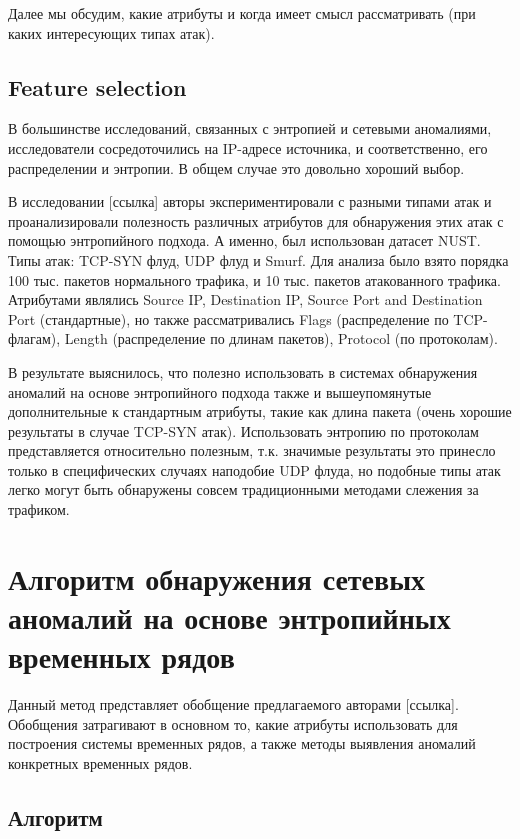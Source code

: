 \documentclass[]{interact}
\theoremstyle{plain}%
\theoremstyle{definition}
\theoremstyle{remark}
\begin{document}
 Далее мы обсудим, какие атрибуты и когда имеет смысл рассматривать (при каких интересующих типах атак).


\subsection{Feature selection}
В большинстве исследований, связанных с энтропией и сетевыми аномалиями, исследователи сосредоточились на IP-адресе источника, и соответственно, его распределении и энтропии. В общем случае это довольно хороший выбор.

В исследовании [ссылка] авторы экспериментировали с разными типами атак и проанализировали полезность различных атрибутов для обнаружения этих атак с помощью энтропийного подхода. А именно, был использован датасет NUST. Типы атак: TCP-SYN флуд, UDP флуд и Smurf. Для анализа было взято порядка 100 тыс. пакетов нормального трафика, и 10 тыс. пакетов атакованного трафика. Атрибутами являлись Source IP, Destination IP, Source Port and Destination Port (стандартные), но также рассматривались Flags (распределение по TCP-флагам), Length (распределение по длинам пакетов), Protocol (по протоколам).

В результате выяснилось, что полезно использовать в системах обнаружения аномалий на основе энтропийного подхода также и вышеупомянутые дополнительные к стандартным атрибуты, такие как длина пакета (очень хорошие результаты в случае TCP-SYN атак). Использовать энтропию по протоколам представляется относительно полезным, т.к. значимые результаты это принесло только в специфических случаях наподобие UDP флуда, но подобные типы атак легко могут быть обнаружены совсем традиционными методами слежения за трафиком.



\section{Алгоритм обнаружения сетевых аномалий на основе энтропийных временных рядов}

Данный метод представляет обобщение предлагаемого авторами [ссылка]. Обобщения затрагивают в основном то, какие атрибуты использовать для построения системы временных рядов, а также методы выявления аномалий конкретных временных рядов.

\subsection{Алгоритм}
\end{document}
